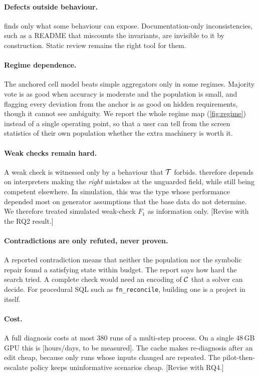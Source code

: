 \paragraph{Defects outside behaviour.} \specdx finds only what some behaviour can expose. Documentation-only inconsistencies, such as a README that miscounts the invariants, are invisible to it by construction. Static review remains the right tool for them.

\paragraph{Regime dependence.} The anchored cell model beats simple aggregators only in some regimes. Majority vote is as good when accuracy is moderate and the population is small, and flagging every deviation from the anchor is as good on hidden requirements, though it cannot see ambiguity. We report the whole regime map (\cref{fig:regime}) instead of a single operating point, so that a user can tell from the screen statistics of their own population whether the extra machinery is worth it.

\paragraph{Weak checks remain hard.} A weak check is witnessed only by a behaviour that $\mathcal{T}$ forbids. \specdx therefore depends on interpreters making the \emph{right} mistakes at the unguarded field, while still being competent elsewhere. In simulation, this was the type whose performance depended most on generator assumptions that the base data do not determine. We therefore treated simulated weak-check $F_1$ as information only. [Revise with the RQ2 result.]

\paragraph{Contradictions are only refuted, never proven.} A reported contradiction means that neither the population nor the symbolic repair found a satisfying state within budget. The report says how hard the search tried. A complete check would need an encoding of $\mathcal{C}$ that a solver can decide. For procedural SQL such as \texttt{fn\_reconcile}, building one is a project in itself.

\paragraph{Cost.} A full diagnosis costs at most 380 runs of a multi-step process. On a single 48\,GB GPU this is [hours/days, to be measured]. The cache makes re-diagnosis after an edit cheap, because only runs whose inputs changed are repeated. The pilot-then-escalate policy keeps uninformative scenarios cheap. [Revise with RQ4.]

